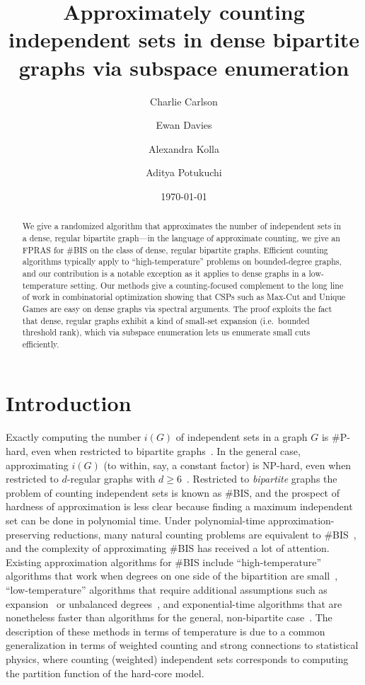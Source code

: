\documentclass[11pt,letterpaper]{amsart}
\title[Approximately counting independent sets in dense bipartite graphs]{Approximately counting independent sets in dense bipartite graphs via subspace enumeration}
\date{\today}
\author[C.\ Carlson]{Charlie Carlson}
\author[E.\ Davies]{Ewan Davies}
\author[A.\ Kolla]{Alexandra Kolla}
\author[A.\ Potukuchi]{Aditya Potukuchi}
\theoremstyle{definition}
\begin{document}
\begin{abstract}
We give a randomized algorithm that approximates the number of independent sets in a dense, regular bipartite graph---in the language of approximate counting, we give an FPRAS for \#BIS on the class of dense, regular bipartite graphs. 
Efficient counting algorithms typically apply to ``high-temperature'' problems on bounded-degree graphs, and our contribution is a notable exception as it applies to dense graphs in a low-temperature setting. 
Our methods give a counting-focused complement to the long line of work in combinatorial optimization showing that CSPs such as Max-Cut and Unique Games are easy on dense graphs via spectral arguments. The proof exploits the fact that dense, regular graphs exhibit a kind of small-set expansion (i.e.\ bounded threshold rank), which via subspace enumeration lets us enumerate small cuts efficiently.
\end{abstract}

\maketitle

\section{Introduction}

Exactly computing the number $i(G)$ of independent sets in a graph $G$ is \#P-hard, even when restricted to bipartite graphs~\cite{PB83}. In the general case, approximating $i(G)$ (to within, say, a constant factor) is NP-hard, even when restricted to $d$-regular graphs with $d\ge 6$~\cite{GGS+11,Sly10,SS12}.
Restricted to \emph{bipartite} graphs the problem of counting independent sets is known as \#BIS, and the prospect of hardness of approximation is less clear because finding a maximum independent set can be done in polynomial time.
Under polynomial-time approximation-preserving reductions, many natural counting problems are equivalent to \#BIS~\cite{DGGJ04}, and the complexity of approximating \#BIS has received a lot of attention. 
Existing approximation algorithms for \#BIS include ``high-temperature'' algorithms that work when degrees on one side of the bipartition are small~\cite{LL15}, ``low-temperature'' algorithms that require additional assumptions such as expansion~\cite{CGG+19,JKP19b} or unbalanced degrees~\cite{CPSODA}, and exponential-time algorithms that are nonetheless faster than algorithms for the general, non-bipartite case~\cite{GLR21}.
The description of these methods in terms of temperature is due to a common generalization in terms of weighted counting and strong connections to statistical physics, where counting (weighted) independent sets corresponds to computing the partition function of the hard-core model.
\end{document}
